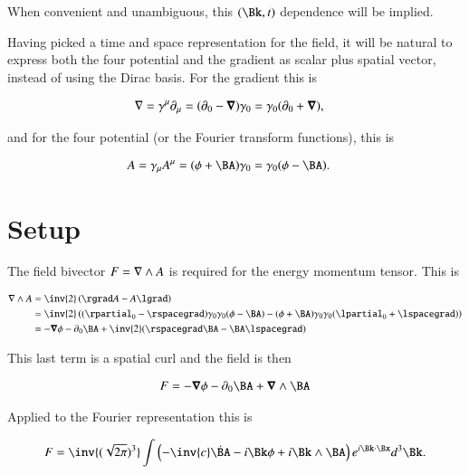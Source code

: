 When convenient and unambiguous, this $(\Bk,t)$ dependence will be implied.

Having picked a time and space representation for the field, it will be natural to express both the four potential and the gradient as scalar plus spatial vector, instead of using the Dirac basis.  For the gradient this is

\begin{align}
\label{eqn:ftMaxVacuum:4}
\nabla &= \gamma^\mu \partial_\mu = (\partial_0 - \boldsymbol{\nabla}) \gamma_0 = \gamma_0 (\partial_0 + \boldsymbol{\nabla}),
\end{align}

and for the four potential (or the Fourier transform functions), this is

\begin{align}
\label{eqn:ftMaxVacuum:5}
A &= \gamma_\mu A^\mu = (\phi + \BA) \gamma_0 = \gamma_0 (\phi - \BA).
\end{align}

\section{Setup}

The field bivector $F = \nabla \wedge A$ is required for the energy momentum tensor.  This is

\begin{align*}
\grad \wedge A
&= \inv{2}\left( \rgrad A - A \lgrad \right) \\
&= \inv{2}\left( (\rpartial_0 - \rspacegrad) \gamma_0 \gamma_0 (\phi - \BA)
- 
(\phi + \BA) \gamma_0 \gamma_0 (\lpartial_0 + \lspacegrad)
\right) \\
&= -\spacegrad \phi -\partial_0 \BA + \inv{2}(\rspacegrad \BA - \BA \lspacegrad) 
\end{align*}

This last term is a spatial curl and the field is then

\begin{align}
\label{eqn:ftMaxVacuum:6}
F = -\spacegrad \phi -\partial_0 \BA + \spacegrad \wedge \BA 
\end{align}

Applied to the Fourier representation this is

\begin{align}
\label{eqn:ftMaxVacuum:7}
F = 
\inv{(\sqrt{2 \pi})^3} \int 
\left( 
- \inv{c} \dot{\BA}
- i \Bk \phi
+ i \Bk \wedge \BA
\right)
e^{i \Bk \cdot \Bx } d^3 \Bk.
\end{align}

